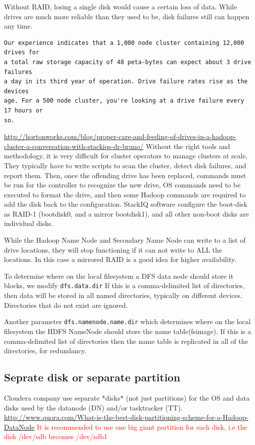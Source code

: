Without RAID, losing a single disk would cause a certain loss of data.
While drives are much more reliable than they used to be, disk failures still
can happen any time.
\begin{verbatim}
Our experience indicates that a 1,000 node cluster containing 12,000 drives for
a total raw storage capacity of 48 peta-bytes can expect about 3 drive failures
a day in its third year of operation. Drive failure rates rise as the devices
age. For a 500 node cluster, you're looking at a drive failure every 17 hours or
so. 
\end{verbatim}
\url{http://hortonworks.com/blog/proper-care-and-feeding-of-drives-in-a-hadoop-cluster-a-conversation-with-stackiqs-dr-bruno/}
Without the right tools and methodology, it is very difficult for cluster
operators to manage clusters at scale. They typically have to write scripts to
scan the cluster, detect disk failures, and report them. Then, once the
offending drive has been replaced, commands must be run for the controller to
recognize the new drive, OS commands need to be executed to format the drive,
and then some Hadoop commands are required to add the disk back to the configuration.    
StackIQ software configure the boot-disk as RAID-1 (bootdisk0, and a
mirror bootdisk1), and all other non-boot disks are individual disks.

While the Hadoop Name Node and Secondary Name Node can write to a list of drive
locations, they will stop functioning if it can not write to ALL the locations.
In this case a mirrored RAID is a good idea for higher availability.   

To determine where on the local filesystem a DFS data node should store it
blocks, we modify \verb!dfs.data.dir! If this is a comma-delimited list of
directories, then data will be stored in all named directories, typically on
different devices. Directories that do not exist are ignored. 

Another parameter \verb!dfs.namenode.name.dir! which determines where on the
local filesystem the HDFS NameNode should store the name table(fsimage). If
this is a comma-delimited list of directories then the name table is replicated in all of
the directories, for redundancy.


\subsection{Seprate disk or separate partition}

Cloudera company use separate *disks* (not just partitions) for the OS and data
disks used by the datanode (DN) and/or tasktracker (TT).
\url{http://www.quora.com/What-is-the-best-disk-partitioning-scheme-for-a-Hadoop-DataNode}
\textcolor{red}{It is recommended to use one big giant partition for each disk,
i.e the disk /dev/sdb becomes /dev/sdb1}

